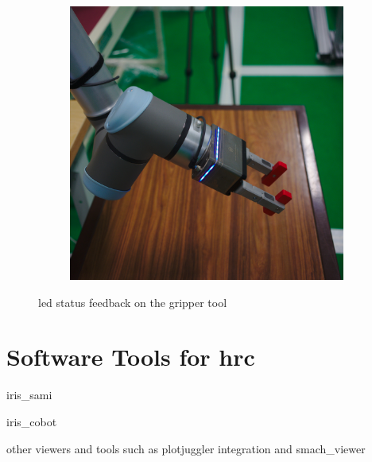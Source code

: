 \begin{figure}[h]
\begin{subfigure}{.2\linewidth}
    \end{subfigure}%
    \begin{subfigure}{.2\linewidth}
        \centering
        \includegraphics[width=.95\linewidth]{figs/chp5/grip_blue.jpg}
    \end{subfigure}
    \caption{\acs{led} status feedback on the gripper tool}
    \label{fig:eef_5_position}
\end{figure}


\section{Software Tools for \acs{hrc}}
\label{sec:tools-hrc}

\par iris\_sami
\par iris\_cobot
\par other viewers and tools such as plotjuggler integration and smach\_viewer
